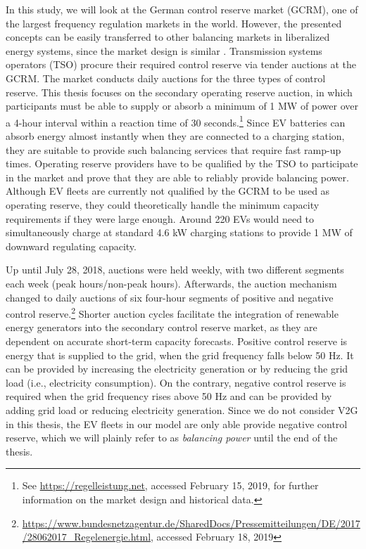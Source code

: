\documentclass[a4paper, 12pt]{article}
\let\cite\shortcite
\begin{document}
In this study, we will look at the German control reserve market (GCRM), one of
the largest frequency regulation markets in the world. However, the presented
concepts can be easily transferred to other balancing markets in liberalized
energy systems, since the market design is similar
\cite{brandt17_evaluat_busin_model_vehic_grid_integ}. Transmission systems
operators (TSO) procure their required control reserve via tender auctions at
the GCRM. The market conducts daily auctions for the three types of control
reserve. This thesis focuses on the secondary operating reserve auction, in
which participants must be able to supply or absorb a minimum of 1 MW of power
over a 4-hour interval within a reaction time of 30 seconds.\footnote{See \url{https://regelleistung.net}, accessed February 15,
2019, for further information on the market design and historical data.} Since EV
batteries can absorb energy almost instantly when they are connected to a
charging station, they are suitable to provide such balancing services that
require fast ramp-up times. Operating reserve providers have to be qualified by
the TSO to participate in the market and prove that they are able to reliably
provide balancing power. Although EV fleets are currently not qualified by the
GCRM to be used as operating reserve, they could theoretically handle the
minimum capacity requirements if they were large enough. Around 220 EVs would
need to simultaneously charge at standard 4.6 kW charging stations to provide 1
MW of downward regulating capacity.

Up until July 28, 2018, auctions were held weekly, with two different segments
each week (peak hours/non-peak hours). Afterwards, the auction mechanism changed
to daily auctions of six four-hour segments of positive and negative control
reserve.\footnote{\url{https://www.bundesnetzagentur.de/SharedDocs/Pressemitteilungen/DE/2017/28062017\_Regelenergie.html},
accessed February 18, 2019} Shorter auction cycles facilitate the integration of renewable
energy generators into the secondary control reserve market, as they are
dependent on accurate short-term capacity forecasts. Positive control reserve is
energy that is supplied to the grid, when the grid frequency falls below 50 Hz.
It can be provided by increasing the electricity generation or by reducing the
grid load (i.e., electricity consumption). On the contrary, negative control
reserve is required when the grid frequency rises above 50 Hz and can be
provided by adding grid load or reducing electricity generation. Since we do not
consider V2G in this thesis, the EV fleets in our model are only able provide
negative control reserve, which we will plainly refer to as \emph{balancing power}
until the end of the thesis.
\end{document}
